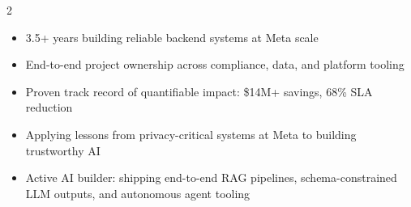 \documentclass[10pt,a4paper,ragged2e,withhyper]{altacv}
\begin{document}
\begin{paracol}{2}

\switchcolumn



\begin{itemize}
    \item 3.5+ years building reliable backend systems at Meta scale
    \item End-to-end project ownership across compliance, data, and platform tooling
    \item Proven track record of quantifiable impact: \$14M+ savings, 68\% SLA reduction
    \item Applying lessons from privacy-critical systems at Meta to building trustworthy AI
    \item Active AI builder: shipping end-to-end RAG pipelines, schema-constrained LLM outputs, and autonomous agent tooling
\end{itemize}






\end{paracol}
\end{document}
